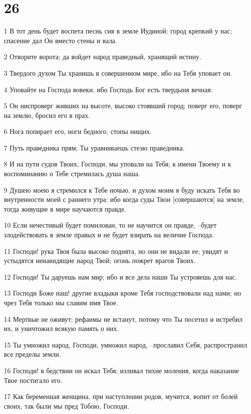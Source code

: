 \chapter{26}

\par 1 В тот день будет воспета песнь сия в земле Иудиной: город крепкий у нас; спасение дал Он вместо стены и вала.
\par 2 Отворите ворота; да войдет народ праведный, хранящий истину.
\par 3 Твердого духом Ты хранишь в совершенном мире, ибо на Тебя уповает он.
\par 4 Уповайте на Господа вовеки, ибо Господь Бог есть твердыня вечная:
\par 5 Он ниспроверг живших на высоте, высоко стоявший город; поверг его, поверг на землю, бросил его в прах.
\par 6 Нога попирает его, ноги бедного, стопы нищих.
\par 7 Путь праведника прям; Ты уравниваешь стезю праведника.
\par 8 И на пути судов Твоих, Господи, мы уповали на Тебя; к имени Твоему и к воспоминанию о Тебе стремилась душа наша.
\par 9 Душею моею я стремился к Тебе ночью, и духом моим я буду искать Тебя во внутренности моей с раннего утра: ибо когда суды Твои [совершаются] на земле, тогда живущие в мире научаются правде.
\par 10 Если нечестивый будет помилован, то не научится он правде, --будет злодействовать в земле правых и не будет взирать на величие Господа.
\par 11 Господи! рука Твоя была высоко поднята, но они не видали ее; увидят и устыдятся ненавидящие народ Твой; огонь пожрет врагов Твоих.
\par 12 Господи! Ты даруешь нам мир; ибо и все дела наши Ты устрояешь для нас.
\par 13 Господи Боже наш! другие владыки кроме Тебя господствовали над нами; но чрез Тебя только мы славим имя Твое.
\par 14 Мертвые не оживут; рефаимы не встанут, потому что Ты посетил и истребил их, и уничтожил всякую память о них.
\par 15 Ты умножил народ, Господи, умножил народ, --прославил Себя, распространил все пределы земли.
\par 16 Господи! в бедствии он искал Тебя; изливал тихие моления, когда наказание Твое постигало его.
\par 17 Как беременная женщина, при наступлении родов, мучится, вопит от болей своих, так были мы пред Тобою, Господи.
